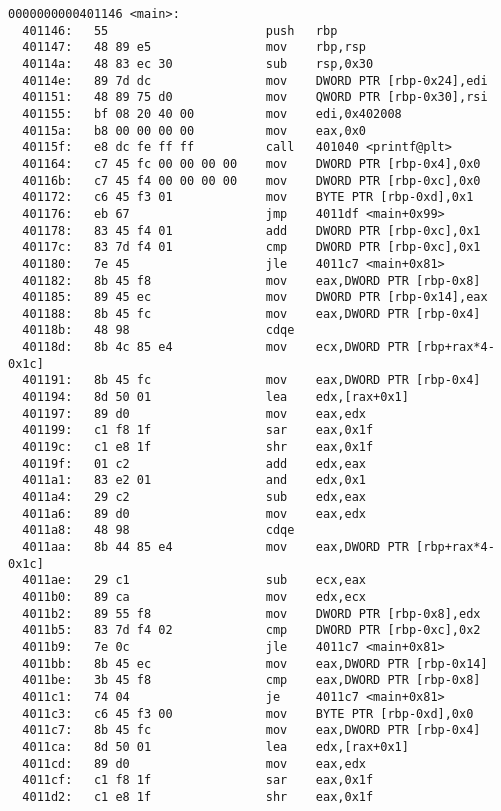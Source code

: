 \documentclass{article}
\begin{document}
\begin{lstlisting}[style=customasm, title={Program1: main }, label=program1]
0000000000401146 <main>:
  401146:	55                   	push   rbp
  401147:	48 89 e5             	mov    rbp,rsp
  40114a:	48 83 ec 30          	sub    rsp,0x30
  40114e:	89 7d dc             	mov    DWORD PTR [rbp-0x24],edi
  401151:	48 89 75 d0          	mov    QWORD PTR [rbp-0x30],rsi
  401155:	bf 08 20 40 00       	mov    edi,0x402008
  40115a:	b8 00 00 00 00       	mov    eax,0x0
  40115f:	e8 dc fe ff ff       	call   401040 <printf@plt>
  401164:	c7 45 fc 00 00 00 00 	mov    DWORD PTR [rbp-0x4],0x0
  40116b:	c7 45 f4 00 00 00 00 	mov    DWORD PTR [rbp-0xc],0x0
  401172:	c6 45 f3 01          	mov    BYTE PTR [rbp-0xd],0x1
  401176:	eb 67                	jmp    4011df <main+0x99>
  401178:	83 45 f4 01          	add    DWORD PTR [rbp-0xc],0x1
  40117c:	83 7d f4 01          	cmp    DWORD PTR [rbp-0xc],0x1
  401180:	7e 45                	jle    4011c7 <main+0x81>
  401182:	8b 45 f8             	mov    eax,DWORD PTR [rbp-0x8]
  401185:	89 45 ec             	mov    DWORD PTR [rbp-0x14],eax
  401188:	8b 45 fc             	mov    eax,DWORD PTR [rbp-0x4]
  40118b:	48 98                	cdqe
  40118d:	8b 4c 85 e4          	mov    ecx,DWORD PTR [rbp+rax*4-0x1c]
  401191:	8b 45 fc             	mov    eax,DWORD PTR [rbp-0x4]
  401194:	8d 50 01             	lea    edx,[rax+0x1]
  401197:	89 d0                	mov    eax,edx
  401199:	c1 f8 1f             	sar    eax,0x1f
  40119c:	c1 e8 1f             	shr    eax,0x1f
  40119f:	01 c2                	add    edx,eax
  4011a1:	83 e2 01             	and    edx,0x1
  4011a4:	29 c2                	sub    edx,eax
  4011a6:	89 d0                	mov    eax,edx
  4011a8:	48 98                	cdqe
  4011aa:	8b 44 85 e4          	mov    eax,DWORD PTR [rbp+rax*4-0x1c]
  4011ae:	29 c1                	sub    ecx,eax
  4011b0:	89 ca                	mov    edx,ecx
  4011b2:	89 55 f8             	mov    DWORD PTR [rbp-0x8],edx
  4011b5:	83 7d f4 02          	cmp    DWORD PTR [rbp-0xc],0x2
  4011b9:	7e 0c                	jle    4011c7 <main+0x81>
  4011bb:	8b 45 ec             	mov    eax,DWORD PTR [rbp-0x14]
  4011be:	3b 45 f8             	cmp    eax,DWORD PTR [rbp-0x8]
  4011c1:	74 04                	je     4011c7 <main+0x81>
  4011c3:	c6 45 f3 00          	mov    BYTE PTR [rbp-0xd],0x0
  4011c7:	8b 45 fc             	mov    eax,DWORD PTR [rbp-0x4]
  4011ca:	8d 50 01             	lea    edx,[rax+0x1]
  4011cd:	89 d0                	mov    eax,edx
  4011cf:	c1 f8 1f             	sar    eax,0x1f
  4011d2:	c1 e8 1f             	shr    eax,0x1f

\end{lstlisting}
\end{document}

